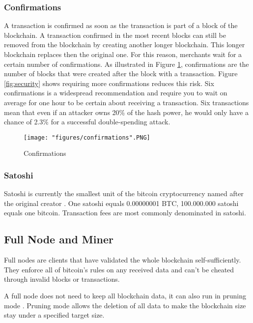 \subsubsection{Confirmations}

A transaction is confirmed as soon as the transaction is part of a block of the blockchain. A transaction confirmed in the most recent blocks can still be removed from the blockchain by creating another longer blockchain. This longer blockchain replaces then the original one. For this reason, merchants wait for a certain number of confirmations. As illustrated in Figure \ref{fig:confirmations}, confirmations are the number of blocks that were created after the block with a transaction. Figure \ref{fig:security} shows requiring more confirmations reduces this risk. Six confirmations is a widespread recommendation and require you to wait on average for one hour to be certain about receiving a transaction. Six transactions mean that even if an attacker owns 20\% of the hash power, he would only have a chance of 2.3\% for a successful double-spending attack.

\begin{figure}[!htb]
\texttt{[image: "figures/confirmations".PNG]}
\caption{Confirmations \cite{confirmation} \label{fig:confirmations}}
\end{figure}

\subsubsection{Satoshi}
Satoshi is currently the smallest unit of the bitcoin cryptocurrency named after the original creator \cite{satoshi}. One satoshi equals 0.00000001 BTC, 100.000.000 satoshi equals one bitcoin. Transaction fees are most commonly denominated in satoshi.

\subsection{Full Node and Miner}
Full nodes are clients that have validated the whole blockchain self-sufficiently. They enforce all of bitcoin's rules on any received data and can't be cheated through invalid blocks or transactions.

A full node does not need to keep all blockchain data, it can also run in pruning mode \cite{fullNode} \cite{fullNode2}. Pruning mode allows the deletion of all data to make the blockchain size stay under a specified target size.

